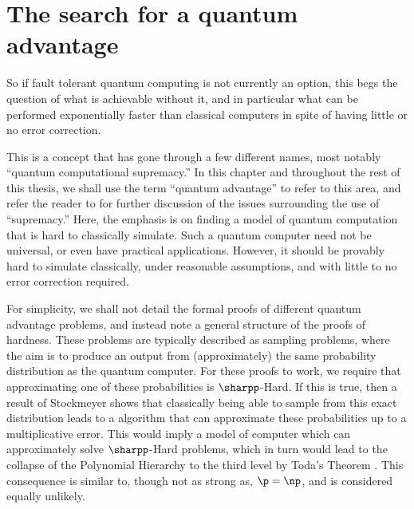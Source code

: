 \section{The search for a quantum advantage}
\label{sec:quantum-advantage}

So if fault tolerant quantum computing is not currently an option, this begs the question of what is achievable without it, and in particular what can be performed exponentially faster than classical computers in spite of having little or no error correction.

This is a concept that has gone through a few different names, most notably ``quantum computational supremacy.'' In this chapter and throughout the rest of this thesis, we shall use the term ``quantum advantage'' to refer to this area, and refer the reader to \cite{wiesner2017, palaciosberraquero2019} for further discussion of the issues surrounding the use of ``supremacy.'' Here, the emphasis is on finding a model of quantum computation that is hard to classically simulate. Such a quantum computer need not be universal, or even have practical applications. However, it should be provably hard to simulate classically, under reasonable assumptions, and with little to no error correction required.

For simplicity, we shall not detail the formal proofs of different quantum advantage problems, and instead note a general structure of the proofs of hardness. These problems are typically described as sampling problems, where the aim is to produce an output from (approximately) the same probability distribution as the quantum computer. For these proofs to work, we require that approximating one of these probabilities is $\sharpp$-Hard. If this is true, then a result of Stockmeyer \cite{stockmeyer1983} shows that classically being able to sample from this exact distribution leads to a algorithm that can approximate these probabilities up to a multiplicative error. This would imply a model of computer which can approximately solve $\sharpp$-Hard problems, which in turn would lead to the collapse of the Polynomial Hierarchy to the third level by Toda's Theorem \cite{toda1991}. This consequence is similar to, though not as strong as, $\p=\np$, and is considered equally unlikely.

